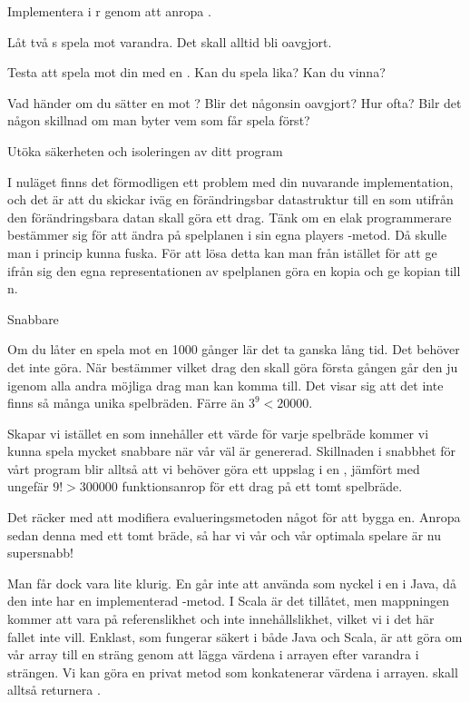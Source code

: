 \Subtask Implementera  i r genom att anropa .

\Subtask Låt två s spela mot varandra. Det skall alltid bli oavgjort.

\Subtask Testa att spela mot din  med en . Kan du spela lika? Kan du vinna?

\Subtask Vad händer om du sätter en  mot ? Blir det någonsin oavgjort? Hur ofta? Bilr det någon skillnad om man byter vem som får spela först?

\Task Utöka säkerheten och isoleringen av ditt program

I nuläget finns det förmodligen ett problem med din nuvarande implementation, och det är att du skickar iväg en förändringsbar datastruktur till en  som utifrån den förändringsbara datan skall göra ett drag. Tänk om en elak programmerare bestämmer sig för att ändra på spelplanen i sin egna players -metod. Då skulle man i princip kunna fuska. För att lösa detta kan man från  istället för att ge ifrån sig den egna representationen av spelplanen göra en kopia och ge kopian till n.

\Task Snabbare 

Om du låter en  spela mot en  1000 gånger lär det ta ganska lång tid. Det behöver det inte göra. När  bestämmer vilket drag den skall göra första gången går den ju igenom alla andra möjliga drag man kan komma till. Det visar sig att det inte finns så många unika spelbräden. Färre än $3^9 < 20000$.

Skapar vi istället en  som innehåller ett värde för varje spelbräde kommer vi kunna spela mycket snabbare när vår  väl är genererad. Skillnaden i snabbhet för vårt program blir alltså att vi behöver göra ett uppslag i en , jämfört med ungefär $9! > 300000$ funktionsanrop för ett drag på ett tomt spelbräde.

Det räcker med att modifiera evalueringsmetoden något för att bygga en. Anropa sedan denna med ett tomt bräde, så har vi vår  och vår optimala spelare är nu supersnabb!

Man får dock vara lite klurig. En  går inte att använda som nyckel i en  i Java, då den inte har en implementerad -metod. I Scala är det tillåtet, men mappningen kommer att vara på referenslikhet och inte innehållslikhet, vilket vi i det här fallet inte vill. Enklast, som fungerar säkert i både Java och Scala, är att göra om vår array till en sträng genom att lägga värdena i arrayen efter varandra i strängen. Vi kan göra en privat metod  som konkatenerar värdena i arrayen.  skall alltså returnera .

